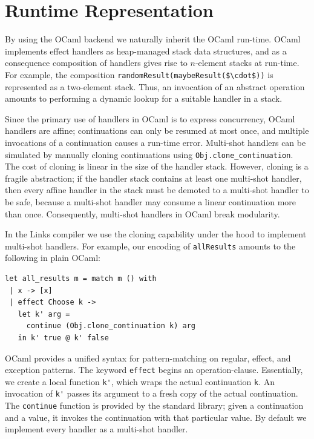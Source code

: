 \documentclass[preprint,numbers]{sigplanconf}
\newcommand{\msgbox}[2]{{%
  \par\noindent\small\color{red}%
  \framebox{\parbox{\dimexpr\linewidth-2\fboxsep-2\fboxrule}{\textbf{#1:} #2}}%
}}
\newcommand{\kc}[1]{\msgbox{KC}{#1}}
\begin{document}

\section{Runtime Representation}
By using the OCaml backend we naturally inherit the OCaml
run-time. OCaml implements effect handlers as heap-managed stack data
structures, and as a consequence composition of handlers gives rise to
$n$-element stacks at run-time. For example, the composition
\lstinline[mathescape]!randomResult(maybeResult($\cdot$))! is
represented as a two-element stack. Thus, an invocation of an abstract
operation amounts to performing a dynamic lookup for a suitable
handler in a stack.

Since the primary use of handlers in OCaml is to express concurrency,
OCaml handlers are affine; continuations can only be resumed at most
once, and multiple invocations of a continuation causes a run-time
error. Multi-shot handlers can be simulated by manually cloning
continuations using \lstinline$Obj.clone_continuation$. The cost of
cloning is linear in the size of the handler stack. However, cloning
is a fragile abstraction; if the handler stack contains at least one
multi-shot handler, then every affine handler in the stack must be
demoted to a multi-shot handler to be safe, because a multi-shot
handler may consume a linear continuation more than
once. Consequently, multi-shot handlers in OCaml break modularity.

In the Links compiler we use the cloning capability under the hood to implement
multi-shot handlers. For example, our encoding of \lstinline$allResults$
amounts to the following in plain OCaml:
\begin{lstlisting}[style=ocaml]
let all_results m = match m () with
 | x -> [x]
 | effect Choose k -> 
   let k' arg = 
     continue (Obj.clone_continuation k) arg 
   in k' true @ k' false
\end{lstlisting}
OCaml provides a unified syntax for pattern-matching on regular, effect, and
exception patterns. The keyword \lstinline[style=ocaml]$effect$ begins an
operation-clause. Essentially, we create a local function \lstinline$k'$, which
wraps the actual continuation \lstinline$k$. An invocation of \lstinline$k'$
passes its argument to a fresh copy of the actual continuation. The
\lstinline$continue$ function is provided by the standard library; given a
continuation and a value, it invokes the continuation with that particular
value. By default we implement every handler as a multi-shot handler.
\end{document}
